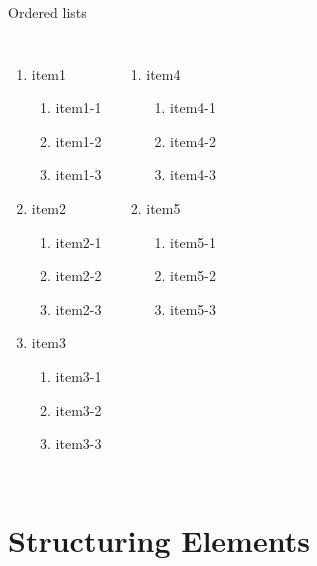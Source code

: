 \documentclass{ELSAbeamer}
\begin{document}
\begin{frame}{Ordered lists}
\begin{columns}
\begin{enumerate}
    \item item1
    \begin{enumerate}
        \item item1-1
        \item item1-2
        \item item1-3
    \end{enumerate}
    \item item2
    \begin{enumerate}
        \item item2-1
        \item item2-2
        \item item2-3
    \end{enumerate}
    \item item3
    \begin{enumerate}
        \item item3-1
        \item item3-2
        \item item3-3
    \end{enumerate}
\end{enumerate}

\begin{enumerate} \itemsep2em
    \setcounter{enumi}{3}
    \item item4
    \begin{enumerate} \itemsep1em
        \item item4-1
        \item item4-2
        \item item4-3
    \end{enumerate}
    \item item5
    \begin{enumerate} \itemsep1em
        \item item5-1
        \item item5-2
        \item item5-3
    \end{enumerate}
\end{enumerate}
\end{columns}
\end{frame}

\section{Structuring Elements}
\end{document}
